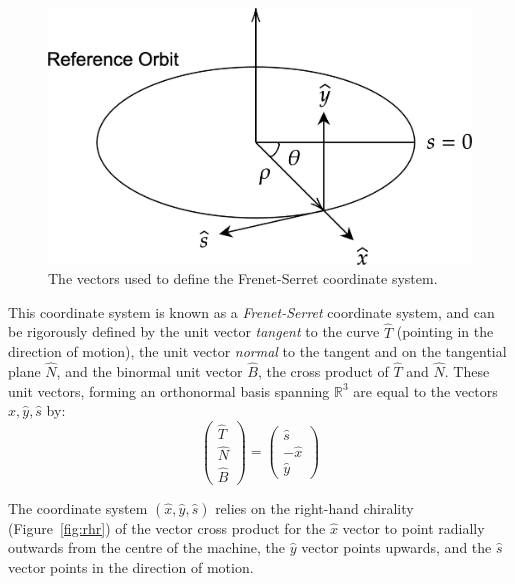 \documentclass[a4paper,twoside,11pt]{report}
\begin{document}
\begin{figure}[!h]
  \centering
  \includegraphics*[width=0.5\linewidth]{coordinate-system.png}
  \caption[Local coordinate system]{The vectors used to define the Frenet-Serret coordinate system.}\label{fig:frenet-serret}
\end{figure}

This coordinate system is known as a {\it Frenet-Serret} coordinate system, and can be rigorously defined by the unit vector {\it tangent} to the curve $\hat T$ (pointing in the direction of motion), the unit vector {\it normal} to the tangent and on the tangential plane $\hat N$, and the binormal unit vector $\hat B$, the cross product of $\hat T$ and $\hat N$. These unit vectors, forming an orthonormal basis spanning $\mathbb{R}^3$ are equal to the vectors $\hat x, \hat y, \hat s$ by:
\begin{equation}
\begin{pmatrix}\hat T\\\hat N\\\hat B \end{pmatrix}=\begin{pmatrix}\hat s\\-\hat x\\\hat y \end{pmatrix}
\end{equation}

The coordinate system $(\hat x, \hat y, \hat s)$ relies on the right-hand chirality (Figure~\ref{fig:rhr}) of the vector cross product for the $\hat x$ vector to point radially outwards from the centre of the machine, the $\hat y$ vector points upwards, and the $\hat s$ vector points in the direction of motion.
\end{document}
